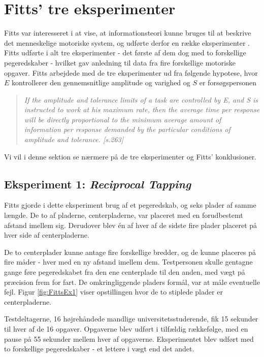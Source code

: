 \section*{Fitts' tre eksperimenter}
Fitts var interesseret i at vise, at informationsteori kunne bruges til at beskrive det menneskelige motoriske system, og udførte derfor en række eksperimenter \cite{fitts1954}. Fitts udførte i alt tre eksperimenter - det første af dem dog med to forskellige pegeredskaber - hvilket gav anledning til data fra fire forskellige motoriske opgaver. Fitts arbejdede med de tre eksperimenter ud fra følgende hypotese, hvor $E$ kontrollerer den gennemsnitlige amplitude og varighed \cite{fitts1954} og $S$ er forsøgspersonen
\begin{quotation}
\textit{If the amplitude and tolerance limits of a task are controlled by E, and S is instructed to work at his maximum rate, then the average time per response will be directly proportional to the minimum average amount of information per response demanded by the particular conditions of amplitude and tolerance. \cite{fitts1954}[s.263]}
\end{quotation}
Vi vil i denne sektion se nærmere på de tre eksperimenter og Fitts' konklusioner.

\subsection*{Eksperiment 1: \textit{Reciprocal Tapping}}
Fitts gjorde i dette eksperiment brug af et pegeredskab, og seks plader af samme længde. De to af pladerne, centerpladerne, var placeret med en forudbestemt afstand imellem sig. Derudover blev én af hver af de sidste fire plader placeret på hver side af centerpladerne.

De to centerplader kunne antage fire forskellige bredder, og de kunne placeres på fire måder - hver med en ny afstand imellem dem. Testpersonen skulle gentagne gange føre pegeredskabet fra den ene centerplade til den anden, med vægt på præcision frem for fart. De omkringliggende pladers formål, var at måle eventuelle fejl. Figur \ref{fig:FittsEx1} viser opstillingen hvor de to stiplede plader er centerpladerne.

Testdeltagerne, 16 højrehåndede mandlige universitetsstuderende, fik 15 sekunder til hver af de 16 opgaver. Opgaverne blev udført i tilfældig rækkefølge, med en pause på 55 sekunder mellem hver af opgaverne. Eksperimentet blev udført med to forskellige pegeredskaber - et lettere i vægt end det andet.

